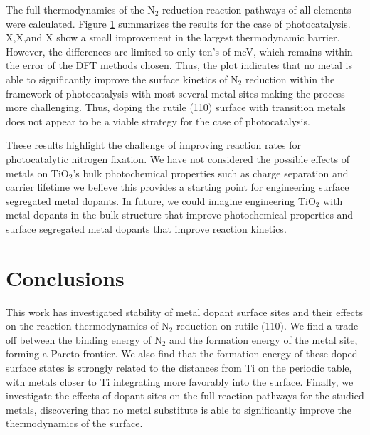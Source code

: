 \documentclass[catalysts,article,submit,moreauthors,pdftex,10pt,a4paper]{mdpi}
\theoremstyle{mdpi}
\newcounter{ex}
\newcounter{re}
\theoremstyle{mdpidefinition}
\begin{document}

The full thermodynamics of the N$_2$ reduction reaction pathways of all elements were calculated. Figure \ref{} summarizes the results for the case of photocatalysis. X,X,and X show a small improvement in the largest thermodynamic barrier. However, the differences are limited to only ten's of meV, which remains within the error of the DFT methods chosen. Thus, the plot indicates that no metal is able to significantly improve the surface kinetics of N$_2$ reduction within the framework of photocatalysis with most several metal sites making the process more challenging. Thus, doping the rutile (110) surface with transition metals does not appear to be a viable strategy for the case of photocatalysis.

These results highlight the challenge of improving reaction rates for photocatalytic nitrogen fixation. We have not considered the possible effects of metals on TiO$_2$'s bulk photochemical properties such as charge separation and carrier lifetime we believe this provides a starting point for engineering surface segregated metal dopants. In future, we could imagine engineering TiO$_2$ with metal dopants in the bulk structure that improve photochemical properties and surface segregated metal dopants that improve reaction kinetics. 


\section{Conclusions}
This work has investigated stability of metal dopant surface sites and their effects on the reaction thermodynamics of N$_2$ reduction on rutile (110). We find a trade-off between the binding energy of N$_2$ and the formation energy of the metal site, forming a Pareto frontier. We also find that the formation energy of these doped surface states is strongly related to the distances from Ti on the periodic table, with metals closer to Ti integrating more favorably into the surface. Finally, we investigate the effects of dopant sites on the full reaction pathways for the studied metals, discovering that no metal substitute is able to significantly improve the thermodynamics of the surface.
\end{document}
